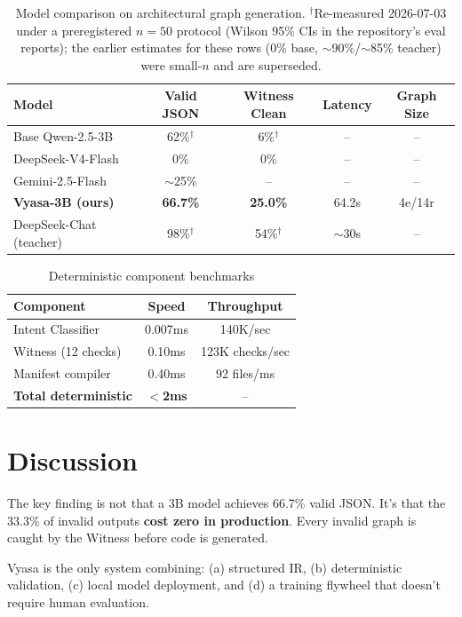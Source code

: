 \documentclass{article}
\begin{document}
\begin{table}[h]
\centering
\begin{tabular}{lcccc}
\toprule
Model & Valid JSON & Witness Clean & Latency & Graph Size \\
\midrule
Base Qwen-2.5-3B & 62\%$^{\dagger}$ & 6\%$^{\dagger}$ & -- & -- \\
DeepSeek-V4-Flash & 0\% & 0\% & -- & -- \\
Gemini-2.5-Flash & $\sim$25\% & -- & -- & -- \\
\textbf{Vyasa-3B (ours)} & \textbf{66.7\%} & \textbf{25.0\%} & 64.2s & 4e/14r \\
DeepSeek-Chat (teacher) & 98\%$^{\dagger}$ & 54\%$^{\dagger}$ & $\sim$30s & -- \\
\bottomrule
\end{tabular}
\caption{Model comparison on architectural graph generation. $^{\dagger}$Re-measured 2026-07-03 under a preregistered $n{=}50$ protocol (Wilson 95\% CIs in the repository's eval reports); the earlier estimates for these rows (0\% base, $\sim$90\%/$\sim$85\% teacher) were small-$n$ and are superseded.}
\end{table}

\begin{table}[h]
\centering
\begin{tabular}{lcc}
\toprule
Component & Speed & Throughput \\
\midrule
Intent Classifier & 0.007ms & 140K/sec \\
Witness (12 checks) & 0.10ms & 123K checks/sec \\
Manifest compiler & 0.40ms & 92 files/ms \\
\textbf{Total deterministic} & \textbf{$<$2ms} & -- \\
\bottomrule
\end{tabular}
\caption{Deterministic component benchmarks}
\end{table}

\section{Discussion}
The key finding is not that a 3B model achieves 66.7\% valid JSON. It's that the 33.3\% of invalid outputs \textbf{cost zero in production}. Every invalid graph is caught by the Witness before code is generated.

Vyasa is the only system combining: (a) structured IR, (b) deterministic validation, (c) local model deployment, and (d) a training flywheel that doesn't require human evaluation.
\end{document}
